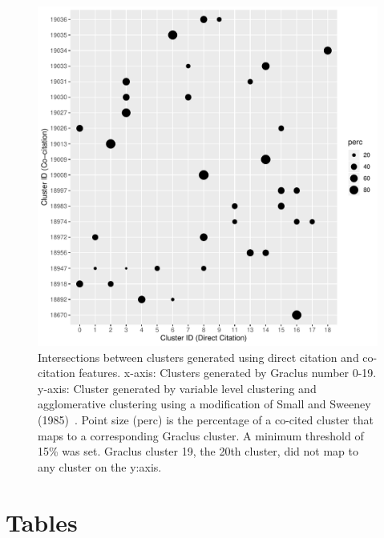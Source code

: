 \begin{figure}[ht]
  \includegraphics[scale=0.45]{graclus_cocit_fig.pdf}
\caption{Intersections between clusters generated using direct citation and co-citation features. x-axis: Clusters generated by Graclus number 0-19. y-axis: Cluster generated by variable level clustering and agglomerative clustering using a modification of Small and Sweeney (1985)~\cite{small_clustering_1985}. Point size (perc) is the percentage of a co-cited cluster that maps to a corresponding Graclus cluster. A minimum threshold of 15\% was set. Graclus cluster 19, the 20th cluster, did not map to any cluster on the y:axis.}
\label{fig:graclus_cocit_fig}       %
\end{figure}
\newpage
\clearpage
\section*{Tables}

